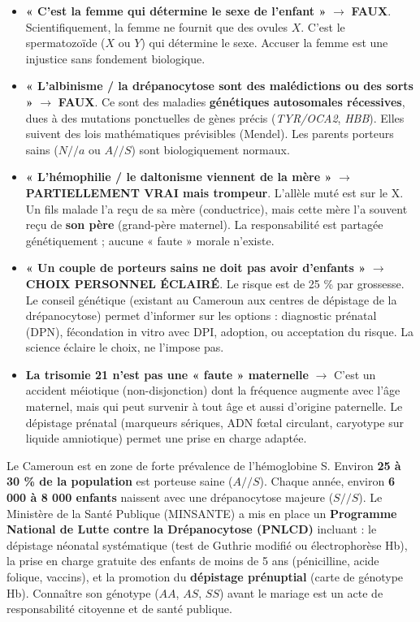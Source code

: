 \documentclass[11pt]{article}
\begin{document}
\begin{aretenir}
\begin{itemize}
\item \textbf{« C'est la femme qui détermine le sexe de l'enfant »} $\rightarrow$ \textbf{FAUX}. Scientifiquement, la femme ne fournit que des ovules $X$. C'est le spermatozoïde ($X$ ou $Y$) qui détermine le sexe. Accuser la femme est une injustice sans fondement biologique.
\item \textbf{« L'albinisme / la drépanocytose sont des malédictions ou des sorts »} $\rightarrow$ \textbf{FAUX}. Ce sont des maladies \textbf{génétiques autosomales récessives}, dues à des mutations ponctuelles de gènes précis (\emph{TYR/OCA2}, \emph{HBB}). Elles suivent des lois mathématiques prévisibles (Mendel). Les parents porteurs sains ($N/\!/a$ ou $A/\!/S$) sont biologiquement normaux.
\item \textbf{« L'hémophilie / le daltonisme viennent de la mère »} $\rightarrow$ \textbf{PARTIELLEMENT VRAI mais trompeur}. L'allèle muté est sur le X. Un fils malade l'a reçu de sa mère (conductrice), mais cette mère l'a souvent reçu de \textbf{son père} (grand-père maternel). La responsabilité est partagée génétiquement ; aucune « faute » morale n'existe.
\item \textbf{« Un couple de porteurs sains ne doit pas avoir d'enfants »} $\rightarrow$ \textbf{CHOIX PERSONNEL ÉCLAIRÉ}. Le risque est de 25 \% par grossesse. Le conseil génétique (existant au Cameroun aux centres de dépistage de la drépanocytose) permet d'informer sur les options : diagnostic prénatal (DPN), fécondation in vitro avec DPI, adoption, ou acceptation du risque. La science éclaire le choix, ne l'impose pas.
\item \textbf{La trisomie 21 n'est pas une « faute » maternelle} $\rightarrow$ C'est un accident méiotique (non-disjonction) dont la fréquence augmente avec l'âge maternel, mais qui peut survenir à tout âge et aussi d'origine paternelle. Le dépistage prénatal (marqueurs sériques, ADN fœtal circulant, caryotype sur liquide amniotique) permet une prise en charge adaptée.
\end{itemize}
\end{aretenir}

\begin{savaistu}
Le Cameroun est en zone de forte prévalence de l'hémoglobine S. Environ \textbf{25 à 30 \% de la population} est porteuse saine ($A/\!/S$). Chaque année, environ \textbf{6 000 à 8 000 enfants} naissent avec une drépanocytose majeure ($S/\!/S$). Le Ministère de la Santé Publique (MINSANTE) a mis en place un \textbf{Programme National de Lutte contre la Drépanocytose (PNLCD)} incluant : le dépistage néonatal systématique (test de Guthrie modifié ou électrophorèse Hb), la prise en charge gratuite des enfants de moins de 5 ans (pénicilline, acide folique, vaccins), et la promotion du \textbf{dépistage prénuptial} (carte de génotype Hb). Connaître son génotype ($AA$, $AS$, $SS$) avant le mariage est un acte de responsabilité citoyenne et de santé publique.
\end{savaistu}
\end{document}
